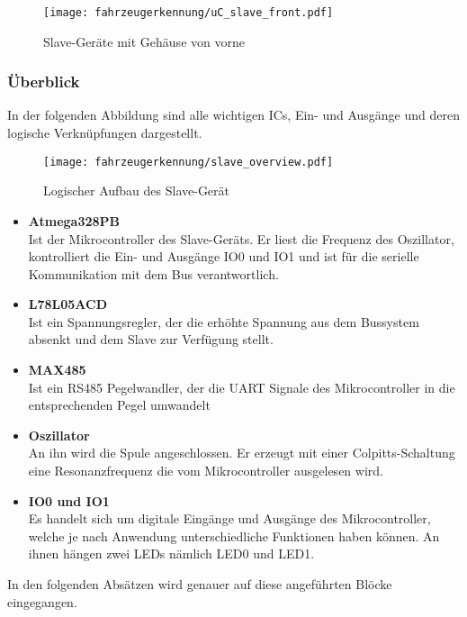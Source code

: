 \begin{figure}[H]
    \centering
    \texttt{[image: fahrzeugerkennung/uC\_slave\_front.pdf]}
    \caption{Slave-Geräte mit Gehäuse von vorne}
    \label{fig:slave_front}
\end{figure}

\subsubsection{Überblick}

In der folgenden Abbildung sind alle wichtigen ICs, Ein- und Ausgänge und deren logische Verknüpfungen dargestellt. 

\begin{figure}[H]
    \centering
    \texttt{[image: fahrzeugerkennung/slave\_overview.pdf]}
    \caption{Logischer Aufbau des Slave-Gerät}
\end{figure}

\begin{itemize}
    \item \textbf{Atmega328PB} \\
    Ist der Mikrocontroller des Slave-Geräts. Er liest die Frequenz des Oszillator, kontrolliert die Ein- und Ausgänge IO0 und IO1 und ist für die serielle Kommunikation mit dem Bus verantwortlich.
    \item \textbf{L78L05ACD} \\
    Ist ein Spannungsregler, der die erhöhte Spannung aus dem Bussystem absenkt und dem Slave zur Verfügung stellt.
    \item \textbf{MAX485} \\
    Ist ein RS485 Pegelwandler, der die UART Signale des Mikrocontroller in die entsprechenden Pegel umwandelt
    \item \textbf{Oszillator} \\
    An ihn wird die Spule angeschlossen. Er erzeugt mit einer Colpitts-Schaltung eine Resonanzfrequenz die vom Mikrocontroller ausgelesen wird.
    
    \item \textbf{IO0 und IO1} \\
    Es handelt sich um digitale Eingänge und Ausgänge des Mikrocontroller, welche je nach Anwendung unterschiedliche Funktionen haben können. 
    An ihnen hängen zwei LEDs nämlich LED0 und LED1.
\end{itemize}

In den folgenden Absätzen wird genauer auf diese angeführten Blöcke eingegangen.

